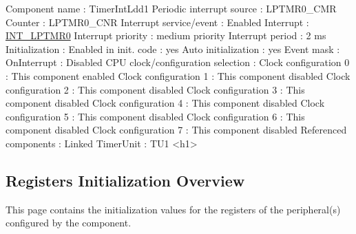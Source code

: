 \begin{DoxyCode}
            Component name                                 : TimerIntLdd1
            Periodic interrupt source                      : LPTMR0\_CMR
            Counter                                        : LPTMR0\_CNR
            Interrupt service/event                        : Enabled
              Interrupt                                    : \hyperlink{group___interrupt__vector__numbers_gga5f3656e2a154b64aa378a2f3856c3a8dadb33151c23fc4df6fa87f60d1df02dae}{INT\_LPTMR0}
              Interrupt priority                           : medium priority
            Interrupt period                               : 2 ms
            Initialization                                 : 
              Enabled in init. code                        : yes
              Auto initialization                          : yes
              Event mask                                   : 
                OnInterrupt                                : Disabled
            CPU clock/configuration selection              : 
              Clock configuration 0                        : This component enabled
              Clock configuration 1                        : This component disabled
              Clock configuration 2                        : This component disabled
              Clock configuration 3                        : This component disabled
              Clock configuration 4                        : This component disabled
              Clock configuration 5                        : This component disabled
              Clock configuration 6                        : This component disabled
              Clock configuration 7                        : This component disabled
            Referenced components                          : 
              Linked TimerUnit                             : TU1
<h1>
\end{DoxyCode}
 \hypertarget{TimerIntLdd1_regs_overview}{}\subsection{Registers Initialization Overview}\label{TimerIntLdd1_regs_overview}
This page contains the initialization values for the registers of the peripheral(s) configured by the component. \tabulinesep=1mm
